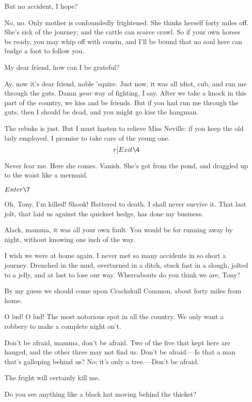 \documentclass{book}
\begin{document}
\4  But no accident, I hope?

\5  No, no.  Only mother is confoundedly frightened.  She thinks
herself forty miles off.  She's sick of the journey; and the cattle can
scarce crawl.  So if your own horses be ready, you may whip off with
cousin, and I'll be bound that no soul here can budge a foot to follow
you.

\4  My dear friend, how can I be grateful?

\5  Ay, now it's dear friend, noble 'squire.  Just now, it was all
idiot, cub, and run me through the guts.  Damn \textit{your} way of fighting, I
say.  After we take a knock in this part of the country, we kiss and be
friends.  But if you had run me through the guts, then I should be
dead, and you might go kiss the hangman.

\4  The rebuke is just.  But I must hasten to relieve Miss
Neville: if you keep the old lady employed, I promise to take care of
the young one.  \[r]Exit \4\]

\5  Never fear me.  Here she comes.  Vanish.  She's got from the
pond, and draggled up to the waist like a mermaid.


\(Enter \7\)


\7  Oh, Tony, I'm killed!  Shook!  Battered to death.  I
shall never survive it.  That last jolt, that laid us against the
quickset hedge, has done my business.

\5  Alack, mamma, it was all your own fault.  You would be for
running away by night, without knowing one inch of the way.

\7  I wish we were at home again.  I never met so many
accidents in so short a journey.  Drenched in the mud, overturned in a
ditch, stuck fast in a slough, jolted to a jelly, and at last to lose
our way.  Whereabouts do you think we are, Tony?

\5  By my guess we should come upon Crackskull Common, about forty
miles from home.

\7  O lud! O lud!  The most notorious spot in all the
country.  We only want a robbery to make a complete night on't.

\5  Don't be afraid, mamma, don't be afraid.  Two of the five that
kept here are hanged, and the other three may not find us.  Don't be
afraid.---Is that a man that's galloping behind us?  No; it's only a
tree.---Don't be afraid.

\7  The fright will certainly kill me.

\5  Do you see anything like a black hat moving behind the thicket?
\end{document}
